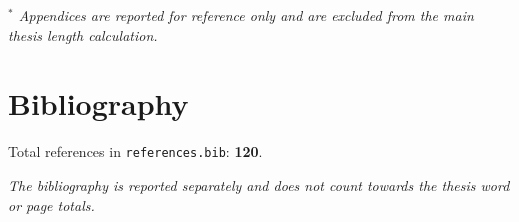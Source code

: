 \documentclass[11pt,a4paper]{article}
\begin{document}
\vspace{0.3cm}

\noindent
\textit{$^{*}$ Appendices are reported for reference only and are
excluded from the main thesis length calculation.}



\section*{Bibliography}

\noindent
Total references in \texttt{references.bib}: \textbf{120}.

\vspace{0.2cm}

\noindent
\textit{The bibliography is reported separately and does not count
towards the thesis word or page totals.}
\end{document}
